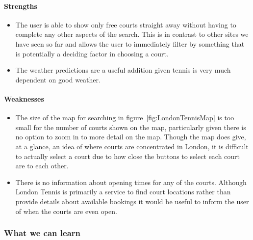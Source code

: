 \paragraph{Strengths}
\begin{itemize}
        \item The user is able to show only free courts straight away without having to complete any other aspects of the search. This is in contrast to other sites we have seen so far and allows the user to immediately filter by something that is potentially a deciding factor in choosing a court.
        \item The weather predictions are a useful addition given tennis is very much dependent on good weather.
\end{itemize}

\paragraph{Weaknesses}
\begin{itemize}
        \item The size of the map for searching in figure~\ref{fig:LondonTennisMap} is too small for the number of courts shown on the map, particularly given there is no option to zoom in to more detail on the map. Though the map does give, at a glance, an idea of where courts are concentrated in London, it is difficult to actually select a court due to how close the buttons to select each court are to each other.
        \item There is no information about opening times for any of the courts. Although London Tennis is primarily a service to find court locations rather than provide details about available bookings it would be useful to inform the user of when the courts are even open.
\end{itemize}

\subsubsection{What we can learn}
\label{ssub:what_we_can_learn}

